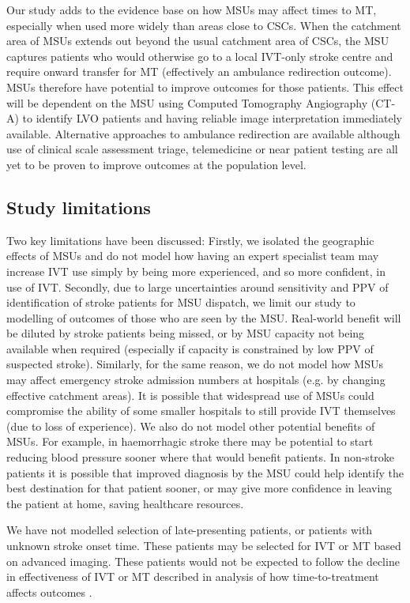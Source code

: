 Our study adds to the evidence base on how MSUs may affect times to MT, especially when used more widely than areas close to CSCs. When the catchment area of MSUs extends out beyond the usual catchment area of CSCs, the MSU captures patients who would otherwise go to a local IVT-only stroke centre and require onward transfer for MT (effectively an ambulance redirection outcome). MSUs therefore have potential to improve outcomes for those patients. This effect will be dependent on the MSU using Computed Tomography Angiography (CT-A) to identify LVO patients and having reliable image interpretation immediately available. Alternative approaches to ambulance redirection are available although use of clinical scale assessment triage, telemedicine or near patient testing are all yet to be proven to improve outcomes at the population level.

\subsection{Study limitations}

Two key limitations have been discussed: Firstly, we isolated the geographic effects of MSUs and do not model how having an expert specialist team may increase IVT use simply by being more experienced, and so more confident, in use of IVT. Secondly, due to large uncertainties around sensitivity and PPV of identification of stroke patients for MSU dispatch, we limit our study to modelling of outcomes of those who are seen by the MSU. Real-world benefit will be diluted by stroke patients being missed, or by MSU capacity not being available when required (especially if capacity is constrained by low PPV of suspected stroke). Similarly, for the same reason, we do not model how MSUs may affect emergency stroke admission numbers at hospitals (e.g. by changing effective catchment areas). It is possible that widespread use of MSUs could compromise the ability of some smaller hospitals to still provide IVT themselves (due to loss of experience). We also do not model other potential benefits of MSUs. For example, in haemorrhagic stroke there may be potential to start reducing blood pressure sooner where that would benefit patients. In non-stroke patients it is possible that improved diagnosis by the MSU could help identify the best destination for that patient sooner, or may give more confidence in leaving the patient at home, saving healthcare resources.

We have not modelled selection of late-presenting patients, or patients with unknown stroke onset time. These patients may be selected for IVT or MT based on advanced imaging. These patients would not be expected to follow the decline in effectiveness of IVT or MT described in analysis of how time-to-treatment affects outcomes \cite{emberson_effect_2014, fransen_time_2016}.

